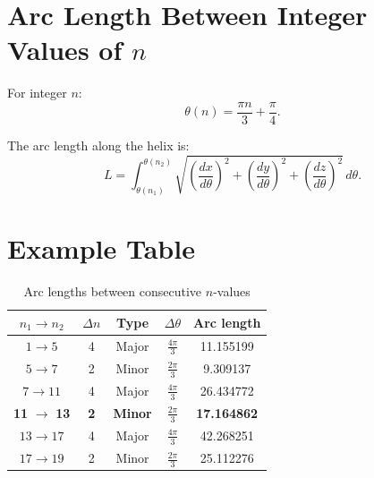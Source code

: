 \section{Arc Length Between Integer Values of $n$}

For integer $n$:
\begin{equation}
\theta(n) = \frac{\pi n}{3} + \frac{\pi}{4}.
\end{equation}

The arc length along the helix is:
\begin{equation}
L = \int_{\theta(n_1)}^{\theta(n_2)}
\sqrt{
\left(\frac{dx}{d\theta}\right)^2
+
\left(\frac{dy}{d\theta}\right)^2
+
\left(\frac{dz}{d\theta}\right)^2
}\, d\theta.
\end{equation}

\section{Example Table}

\begin{table}[ht]
\centering
\caption{Arc lengths between consecutive $n$-values}
\begin{tabular}{ccccc}
\toprule
$n_1 \to n_2$ & $\Delta n$ & Type & $\Delta\theta$ & Arc length \\
\midrule
$1 \to 5$ & 4 & Major & $\frac{4\pi}{3}$ & 11.155199 \\
$5 \to 7$ & 2 & Minor & $\frac{2\pi}{3}$ & 9.309137 \\
$7 \to 11$ & 4 & Major & $\frac{4\pi}{3}$ & 26.434772 \\
\rowcolor{yellow!30}
\textbf{11} $\to$ \textbf{13} & \textbf{2} & \textbf{Minor} & $\frac{2\pi}{3}$ & \textbf{17.164862} \\
$13 \to 17$ & 4 & Major & $\frac{4\pi}{3}$ & 42.268251 \\
$17 \to 19$ & 2 & Minor & $\frac{2\pi}{3}$ & 25.112276 \\
\bottomrule
\end{tabular}
\end{table}


